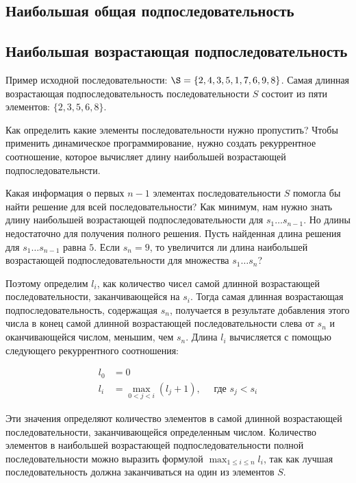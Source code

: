 \documentclass[14pt]{book}
\begin{document}
\subsection{Наибольшая общая подпоследовательность}

\subsection{Наибольшая возрастающая подпоследовательность}

Пример исходной последовательности: $\S=\{2,4,3,5,1,7,6,9,8\}$. Самая длинная возрастающая
подпоследовательность последовательности $S$ состоит из пяти элементов: $\{2,3,5,6,8\}$.

Как определить какие элементы последовательности нужно пропустить? Чтобы применить динамическое
программирование, нужно создать рекуррентное соотношение, которое вычисляет длину
наибольшей возрастающей подпоследовательнсти.

Какая информация о первых $n-1$ элементах последовательности $S$ помогла бы найти решение для
всей последовательности? Как минимум, нам нужно знать длину наибольшей возрастающей 
подпоследовательности для $s_1 \ldots s_{n-1}$. Но длины недостаточно для получения полного
решения. Пусть найденная длина решения для $s_1 \ldots s_{n-1}$ равна $5$. Если $s_n = 9$,
то увеличится ли длина наибольшей возрастающей подпоследовательности для множества
$s_1 \ldots s_n$?

Поэтому определим $l_i$, как количество чисел самой длинной возрастающей последовательности,
заканчивающейся на $s_i$. Тогда самая длинная возрастающая подпоследовательность, содержащая
$s_n$, получается в результате добавления этого числа в конец самой длинной возрастающей
последовательности слева от $s_n$ и оканчивающейся числом, меньшим, чем $s_n$. Длина $l_i$
вычисляется с помощью следующего рекуррентного соотношения:

\begin{align*}
l_0 &= 0 \\
l_i &= \max_{0<j<i}(l_j + 1), \quad \text{ где $s_j < s_i$}
\end{align*}

Эти значения определяют количество элементов в самой длинной возрастающей последовательности,
заканчивающейся определенным числом. Количество элементов в наибольшей возрастающей
подпоследовательности полной последовательности можно выразить формулой $\max_{1\le i\le n}l_i$,
так как лучшая последовательность должна заканчиваться на один из элементов $S$.
\end{document}
